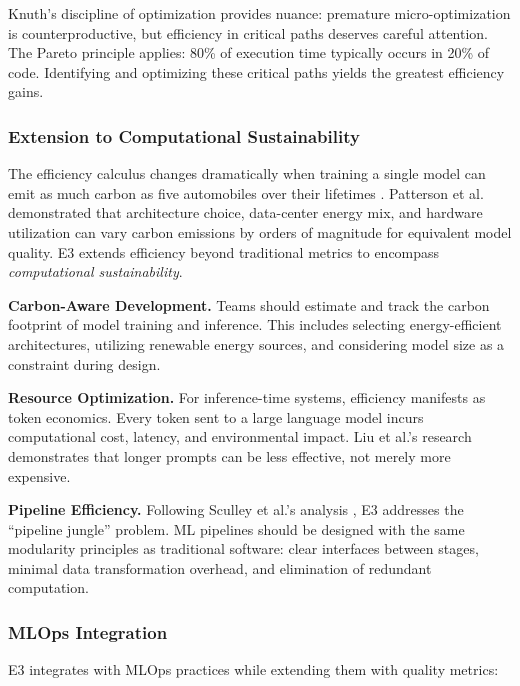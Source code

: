 \documentclass[11pt,a4paper]{article}
\begin{document}
Knuth's discipline of optimization \cite{knuth1974structured} provides nuance: premature micro-optimization is counterproductive, but efficiency in critical paths deserves careful attention. The Pareto principle applies: 80\% of execution time typically occurs in 20\% of code. Identifying and optimizing these critical paths yields the greatest efficiency gains.

\subsubsection{Extension to Computational Sustainability}

The efficiency calculus changes dramatically when training a single model can emit as much carbon as five automobiles over their lifetimes \cite{strubell2019energy}. Patterson et al. \cite{patterson2021carbon} demonstrated that architecture choice, data-center energy mix, and hardware utilization can vary carbon emissions by orders of magnitude for equivalent model quality. E3 extends efficiency beyond traditional metrics to encompass \emph{computational sustainability}.

\textbf{Carbon-Aware Development.} Teams should estimate and track the carbon footprint of model training and inference. This includes selecting energy-efficient architectures, utilizing renewable energy sources, and considering model size as a constraint during design.

\textbf{Resource Optimization.} For inference-time systems, efficiency manifests as token economics. Every token sent to a large language model incurs computational cost, latency, and environmental impact. Liu et al.'s research \cite{liu2023lost} demonstrates that longer prompts can be less effective, not merely more expensive.

\textbf{Pipeline Efficiency.} Following Sculley et al.'s analysis \cite{sculley2015hidden}, E3 addresses the ``pipeline jungle'' problem. ML pipelines should be designed with the same modularity principles as traditional software: clear interfaces between stages, minimal data transformation overhead, and elimination of redundant computation.

\subsubsection{MLOps Integration}

E3 integrates with MLOps practices \cite{sridhar2022mlops} while extending them with quality metrics:
\end{document}
